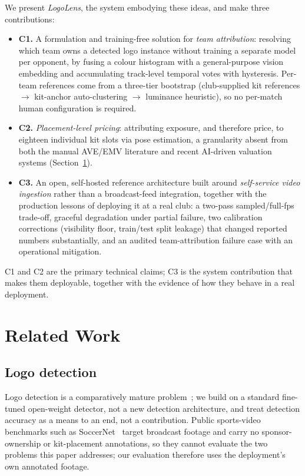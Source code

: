 \documentclass[conference,a4paper]{IEEEtran}
\begin{document}
We present \emph{LogoLens}, the system embodying these ideas, and make three
contributions:
\begin{itemize}
  \item \textbf{C1.} A formulation and training-free solution for
  \emph{team attribution}: resolving which team owns a detected logo instance without
  training a separate model per opponent, by fusing a colour histogram with a
  general-purpose vision embedding and accumulating track-level temporal votes with
  hysteresis. Per-team references come from a three-tier bootstrap (club-supplied kit
  references $\to$ kit-anchor auto-clustering $\to$ luminance heuristic), so no
  per-match human configuration is required.
  \item \textbf{C2.} \emph{Placement-level pricing}: attributing exposure, and
  therefore price, to eighteen individual kit slots via pose estimation, a granularity
  absent from both the manual AVE/EMV literature and recent AI-driven valuation systems
  (Section~\ref{sec:related}).
  \item \textbf{C3.} An open, self-hosted reference architecture built around
  \emph{self-service video ingestion} rather than a broadcast-feed integration,
  together with the production lessons of deploying it at a real club: a two-pass
  sampled/full-fps trade-off, graceful degradation under partial failure, two
  calibration corrections (visibility floor, train/test split leakage) that changed
  reported numbers substantially, and an audited team-attribution failure case with an
  operational mitigation.
\end{itemize}
C1 and C2 are the primary technical claims; C3 is the system contribution that makes
them deployable, together with the evidence of how they behave in a real deployment.

\section{Related Work}
\label{sec:related}

\subsection{Logo detection}
Logo detection is a comparatively mature problem~\cite{logo_detection_survey}; we build
on a standard fine-tuned open-weight detector, not a new detection
architecture, and treat detection accuracy as a means to an end, not a contribution. Public sports-video benchmarks such as
SoccerNet~\cite{soccernet_v2} target broadcast footage and carry no sponsor-ownership
or kit-placement annotations, so they cannot evaluate the two problems this paper
addresses; our evaluation therefore uses the deployment's own annotated footage.
\end{document}
